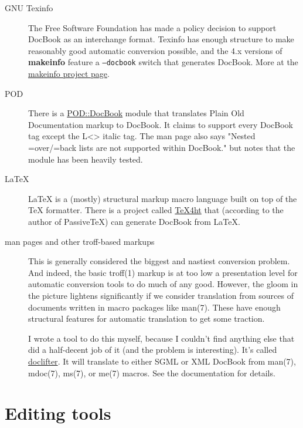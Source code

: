 \documentclass[pdftex,english,a4paper,10pt]{infocom}
\begin{document}
\noindent
 
	\begin{description}
	\item[GNU Texinfo] 
The Free Software Foundation has made a policy decision to
support DocBook as an interchange format.  Texinfo has enough
structure to make reasonably good automatic conversion possible, and
the 4.x versions of {\bf makeinfo} feature a
{\tt{--docbook}} switch that generates DocBook.  More at the
\href{http://www.gnu.org/directory/texinfo.html}{makeinfo
project page}.
\item[POD] 
There is a \href{http://www.cpan.org/modules/by-module/Pod/}{POD::DocBook}
module that translates Plain Old Documentation markup to DocBook.  It
claims to support every DocBook tag except the L\textless{}\textgreater{} italic tag.
The man page also says "Nested =over/=back lists are not supported
within DocBook." but notes that the module has been heavily
tested.
\item[LaTeX] 
LaTeX is a (mostly) structural markup macro language built on
top of the TeX formatter.  There is a project called \href{http://www.lrz-muenchen.de/services/software/sonstiges/tex4ht/mn.html}{
TeX4ht} that (according to the author of PassiveTeX) can
generate DocBook from LaTeX.
\item[man pages and other troff-based markups] 
This is generally considered the biggest and nastiest conversion
problem.  And indeed, the basic
troff(1) markup is at too low a presentation
level for automatic conversion tools to do much of any good.  However,
the gloom in the picture lightens significantly if we consider
translation from sources of documents written in macro packages like
man(7).  These have enough structural
features for automatic translation to get some traction.

I wrote a tool to do this myself, because I couldn't find
anything else that did a half-decent job of it (and the problem is
interesting).  It's called \href{http://www.tuxedo.org/~esr/doclifter/}{doclifter}.  It will
translate to either SGML or XML DocBook from
man(7),
mdoc(7),
ms(7), or
me(7) macros.  See the documentation
for details.

	\end{description}
    
\section{Editing tools}
\label{id2719956}\hypertarget{id2719956}{}%
\end{document}
